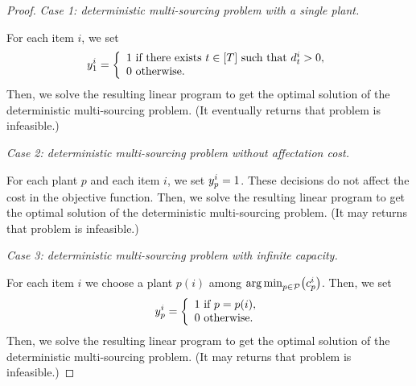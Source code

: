 \begin{proof}
\emph{Case 1: deterministic multi-sourcing problem with a single plant.}

For each item $i$, we set
$$
\open_1^i=
\left\{
\begin{array}{l}
1\mbox{ if there exists }t\in\range{\horizon}\mbox{ such that }\demand_t^i>0,\\
0\mbox{ otherwise}.
\end{array}
\right.
$$
Then, we solve the resulting linear program to get the optimal solution of the deterministic multi-sourcing problem.
(It eventually returns that problem is infeasible.)

\medskip

\emph{Case 2: deterministic multi-sourcing problem without affectation cost.}

For each plant $p$ and each item $i$, we set $y_p^i=1$.
These decisions do not affect the cost in the objective function.
Then, we solve the resulting linear program to get the optimal solution of the deterministic multi-sourcing problem.
(It may returns that problem is infeasible.)

\medskip

\emph{Case 3: deterministic multi-sourcing problem with infinite capacity.}

For each item $i$ we choose a plant $p(i)$ among $\argmin_{p\in\plants}\bracket{\affect_p^i}$.
Then, we set
$$
\open_p^i=
\left\{
\begin{array}{l}
1\mbox{ if }p=p(i),\\
0\mbox{ otherwise}.
\end{array}
\right.
$$
Then, we solve the resulting linear program to get the optimal solution of the deterministic multi-sourcing problem.
(It may returns that problem is infeasible.)
\end{proof}



